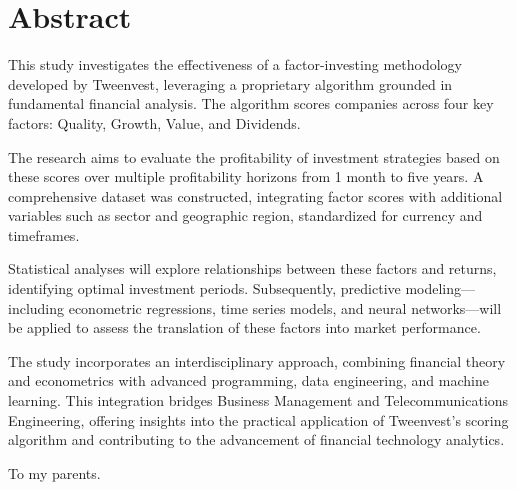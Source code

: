 \documentclass[11pt,english,a4paper,hidelinks]{book}
\begin{document}
\renewcommand{\listtablename}{List of Tables} 
\renewcommand{\tablename}{Table} 

 
\newpage
\thispagestyle{empty}

\section*{Abstract}
\noindent This study investigates the effectiveness of a factor-investing methodology developed by Tweenvest, leveraging a proprietary algorithm grounded in fundamental financial analysis. The algorithm scores companies across four key factors: Quality, Growth, Value, and Dividends.

\vspace{0.5cm}

\noindent The research aims to evaluate the profitability of investment strategies based on these scores over multiple profitability horizons from 1 month to five years. A comprehensive dataset was constructed, integrating factor scores with additional variables such as sector and geographic region, standardized for currency and timeframes.

\vspace{0.5cm}

\noindent Statistical analyses will explore relationships between these factors and returns, identifying optimal investment periods. Subsequently, predictive modeling—including econometric regressions, time series models, and neural networks—will be applied to assess the translation of these factors into market performance.

\vspace{0.5cm}

\noindent The study incorporates an interdisciplinary approach, combining financial theory and econometrics with advanced programming, data engineering, and machine learning. This integration bridges Business Management and Telecommunications Engineering, offering insights into the practical application of Tweenvest's scoring algorithm and contributing to the advancement of financial technology analytics.


\newpage
\thispagestyle{empty}
\vfill
\begin{flushright}
To my parents.
\end{flushright}
\vfill\vfill
\end{document}
